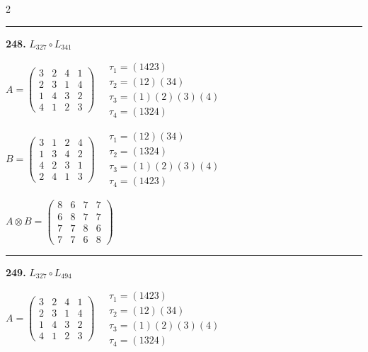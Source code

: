\begin{multicols}{2}
\vspace{0.3em}
\hrule
\vspace{0.3em}

\noindent\textbf{248.} $L_{327} \circ L_{341}$

$A = \begin{pmatrix} 3 & 2 & 4 & 1 \\ 2 & 3 & 1 & 4 \\ 1 & 4 & 3 & 2 \\ 4 & 1 & 2 & 3 \end{pmatrix} \quad \begin{matrix} \tau_{1}=(1 4 2 3) \\ \tau_{2}=(1 2)(3 4) \\ \tau_{3}=(1)(2)(3)(4) \\ \tau_{4}=(1 3 2 4) \end{matrix}$

$B = \begin{pmatrix} 3 & 1 & 2 & 4 \\ 1 & 3 & 4 & 2 \\ 4 & 2 & 3 & 1 \\ 2 & 4 & 1 & 3 \end{pmatrix} \quad \begin{matrix} \tau_{1}=(1 2)(3 4) \\ \tau_{2}=(1 3 2 4) \\ \tau_{3}=(1)(2)(3)(4) \\ \tau_{4}=(1 4 2 3) \end{matrix}$

$A \otimes B = \begin{pmatrix} 8 & 6 & 7 & 7 \\ 6 & 8 & 7 & 7 \\ 7 & 7 & 8 & 6 \\ 7 & 7 & 6 & 8 \end{pmatrix}$

\vspace{0.3em}
\hrule
\vspace{0.3em}

\noindent\textbf{249.} $L_{327} \circ L_{494}$

$A = \begin{pmatrix} 3 & 2 & 4 & 1 \\ 2 & 3 & 1 & 4 \\ 1 & 4 & 3 & 2 \\ 4 & 1 & 2 & 3 \end{pmatrix} \quad \begin{matrix} \tau_{1}=(1 4 2 3) \\ \tau_{2}=(1 2)(3 4) \\ \tau_{3}=(1)(2)(3)(4) \\ \tau_{4}=(1 3 2 4) \end{matrix}$


\end{multicols}
